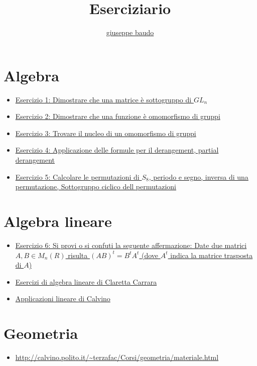 \documentclass[a4paper,10pt]{article}
\title{Eserciziario}
\author{\href{http://www.baudo.hol.es}{giuseppe baudo}}
\begin{document}
\maketitle

\section{Algebra}
\begin{itemize}
 \item \href{./esercizio1.html}{Esercizio 1: Dimostrare che una matrice è sottogruppo di $GL_{n}$}
 \item \href{./esercizio2.html}{Esercizio 2: Dimostrare che una funzione è omomorfismo di gruppi}
 \item \href{./esercizio3.html}{Esercizio 3: Trovare il nucleo di un omomorfismo di gruppi}
 \item \href{./esercizio4.html}{Esercizio 4: Applicazione delle formule per il derangement, partial derangement}
 \item \href{./esercizio5.html}{Esercizio 5: Calcolare le permutazioni di $S_{8}$, periodo e segno, inversa di una permutazione, Sottogruppo ciclico dell permutazioni}
\end{itemize}

\section{Algebra lineare}
\begin{itemize}
 \item \href{./esercizio6.html}{Esercizio 6: Si provi o si confuti la seguente affermazione: Date due matrici $A, B \in M_n(R)$ risulta $(AB)^t = B^tA^t$ (dove $A^t$ indica la matrice trasposta di $A$)}
 \item \href{../book/AlgebraLineare/}{Esercizi di algebra lineare di Claretta Carrara}
 \item \href{../book/AlgebraLineare/}{Applicazioni lineare di Calvino}
\end{itemize}

\section{Geometria}
 \begin{itemize}
  \item \url{http://calvino.polito.it/~terzafac/Corsi/geometria/materiale.html}
 \end{itemize}

 
\end{document}
